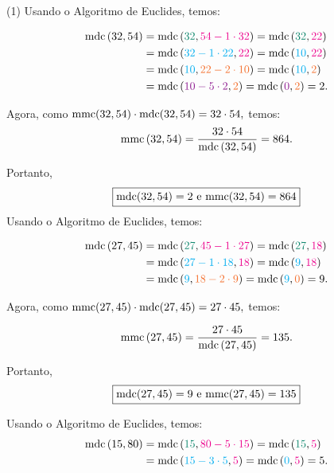 \documentclass[12pt, a4paper]{article}
\newcommand{\mdc}{{\rm mdc}}
\newcommand{\mmc}{{\rm mmc}}
\newcommand{\negrito}[1]{\mbox{\boldmath{$#1$}}}
\newcommand{\itens}[1]{\begin{tasks}[label={(tsk[a])},label-width=3.6ex, label-format = {\bfseries}, column-sep = {0pt}](1) #1\end{tasks}}
\newcommand{\alt}[1]{\textcolor{Floresta}{$\negrito{(#1)} $}}
\begin{document}
\begin{solution}
\itens{
    \task[\alt{a}] Usando o Algoritmo de Euclides, temos:
    
    \begin{align*}\mdc \left(32, 54 \right) &=\mdc \left( \textcolor{PineGreen}{32}, \textcolor{Magenta}{54-1\cdot 32} \right) =\mdc \left( \textcolor{PineGreen}{32}, \textcolor{Magenta}{22} \right) \\&=\mdc \left( \textcolor{Cyan}{32-1\cdot 22}, \textcolor{Magenta}{22} \right) =
    \mdc \left(\textcolor{Cyan}{10}, \textcolor{Magenta}{22}\right) \\&=\mdc \left( \textcolor{Cyan}{10}, \textcolor{Orange}{22-2\cdot10} \right) =\mdc \left(\textcolor{Cyan}{10}, \textcolor{Orange}{2} \right) \\&=\mdc \left( \textcolor{Plum}{10-5\cdot2}, \textcolor{Orange}{2} \right) =\mdc \left( \textcolor{Plum}{0}, \textcolor{Orange}{2} \right) =2.
    \end{align*}

Agora, como $\mmc(32, 54) \cdot \mdc( 32, 54) = 32 \cdot 54,$ temos:
    $$\mmc \left( 32, 54 \right) =\frac{32\cdot 54}{\mdc \left( 32, 54 \right)}=864.$$


Portanto,
\[
\boxed{\mdc(32,54) = 2 \text{ e } \mmc(32,54) = 864}
\]
    \task[\alt{b}] Usando o Algoritmo de Euclides, temos:
    
    \begin{align*}
    \mdc \left( 27, 45 \right) &=\mdc \left( \textcolor{PineGreen}{27}, \textcolor{Magenta}{45-1\cdot27} \right) =\mdc \left( \textcolor{PineGreen}{27}, \textcolor{Magenta}{18} \right) \\&=\mdc \left( \textcolor{Cyan}{27-1\cdot18}, \textcolor{Magenta}{18} \right) =
    \mdc \left( \textcolor{Cyan}{9}, \textcolor{Magenta}{18} \right)\\& =\mdc \left( \textcolor{Cyan}{9}, \textcolor{Orange}{18-2\cdot9} \right) =\mdc \left( \textcolor{Cyan}{9}, \textcolor{Orange}{0} \right) =9.
    \end{align*}
    
  Agora, como $\mmc(27, 45) \cdot \mdc( 27, 45) = 27 \cdot 45,$ temos:

    $$\mmc \left( 27, 45 \right) =\frac{27\cdot 45}{\mdc \left(27, 45\right) }=135.$$

Portanto,
\[
\boxed{\mdc(27,45) = 9 \text{ e } \mmc(27,45) = 135}
\]

    
    \task[\alt{c}] Usando o Algoritmo de Euclides, temos:
     \begin{align*}
    \mdc \left( 15, 80 \right) &=\mdc \left( \textcolor{PineGreen}{15}, \textcolor{Magenta}{80-5\cdot15} \right) =\mdc \left( \textcolor{PineGreen}{15}, \textcolor{Magenta}{5} \right) \\&=\mdc \left( \textcolor{Cyan}{15-3\cdot5}, \textcolor{Magenta}{5} \right) =
    \mdc \left( \textcolor{Cyan}{0}, \textcolor{Magenta}{5} \right)=5.
    \end{align*}
    
}
\end{solution}
\end{document}
